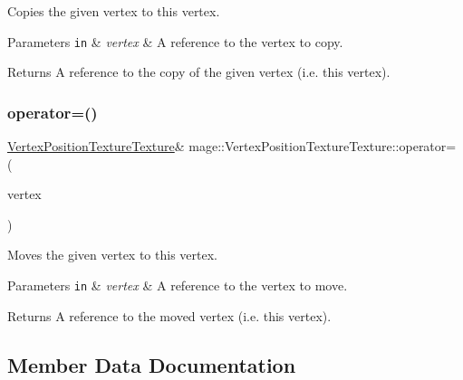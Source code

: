 Copies the given vertex to this vertex.


\begin{DoxyParams}[1]{Parameters}
\mbox{\tt in}  & {\em vertex} & A reference to the vertex to copy. \\
\hline
\end{DoxyParams}
\begin{DoxyReturn}{Returns}
A reference to the copy of the given vertex (i.\+e. this vertex). 
\end{DoxyReturn}
\hypertarget{structmage_1_1_vertex_position_texture_texture_a4e6539fcab28def222ec66a3162b8cd9}{}\label{structmage_1_1_vertex_position_texture_texture_a4e6539fcab28def222ec66a3162b8cd9} 
\subsubsection{\texorpdfstring{operator=()}{operator=()}\hspace{0.1cm}{\footnotesize\ttfamily [2/2]}}
{\footnotesize\ttfamily \hyperlink{structmage_1_1_vertex_position_texture_texture}{Vertex\+Position\+Texture\+Texture}\& mage\+::\+Vertex\+Position\+Texture\+Texture\+::operator= (\begin{DoxyParamCaption}\item[{\hyperlink{structmage_1_1_vertex_position_texture_texture}{Vertex\+Position\+Texture\+Texture} \&\&}]{vertex }\end{DoxyParamCaption})\hspace{0.3cm}{\ttfamily [default]}}

Moves the given vertex to this vertex.


\begin{DoxyParams}[1]{Parameters}
\mbox{\tt in}  & {\em vertex} & A reference to the vertex to move. \\
\hline
\end{DoxyParams}
\begin{DoxyReturn}{Returns}
A reference to the moved vertex (i.\+e. this vertex). 
\end{DoxyReturn}


\subsection{Member Data Documentation}
\hypertarget{structmage_1_1_vertex_position_texture_texture_a82f271622e34a209d7a3918e7a0190e4}{}\label{structmage_1_1_vertex_position_texture_texture_a82f271622e34a209d7a3918e7a0190e4} 
